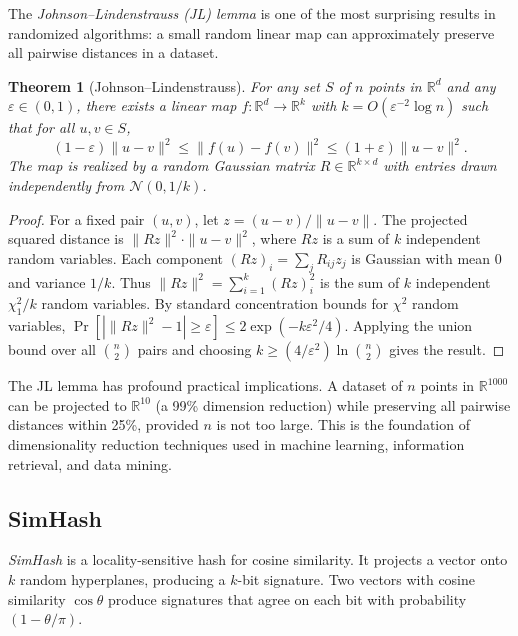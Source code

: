 \documentclass[twoside,12pt]{book}
\theoremstyle{plain}
\newtheorem{theorem}{Theorem}[chapter]
\theoremstyle{definition}
\theoremstyle{remark}
\begin{document}
The \emph{Johnson--Lindenstrauss (JL) lemma} is one of the most surprising results in randomized algorithms: a small random linear map can approximately preserve all pairwise distances in a dataset.

\begin{theorem}[Johnson--Lindenstrauss]\label{thm:jl}
For any set $S$ of $n$ points in $\mathbb{R}^d$ and any $\varepsilon \in (0,1)$, there exists a linear map $f : \mathbb{R}^d \to \mathbb{R}^k$ with $k = O(\varepsilon^{-2} \log n)$ such that for all $u, v \in S$,
\[
(1 - \varepsilon) \|u - v\|^2 \leq \|f(u) - f(v)\|^2 \leq (1 + \varepsilon) \|u - v\|^2.
\]
The map is realized by a random Gaussian matrix $R \in \mathbb{R}^{k \times d}$ with entries drawn independently from $\mathcal{N}(0, 1/k)$.
\end{theorem}

\begin{proof}
For a fixed pair $(u,v)$, let $z = (u - v)/\|u - v\|$. The projected squared distance is $\|Rz\|^2 \cdot \|u-v\|^2$, where $Rz$ is a sum of $k$ independent random variables. Each component $(Rz)_i = \sum_j R_{ij} z_j$ is Gaussian with mean 0 and variance $1/k$. Thus $\|Rz\|^2 = \sum_{i=1}^k (Rz)_i^2$ is the sum of $k$ independent $\chi^2_1 / k$ random variables. By standard concentration bounds for $\chi^2$ random variables, $\Pr[|\|Rz\|^2 - 1| \geq \varepsilon] \leq 2 \exp(-k \varepsilon^2 / 4)$. Applying the union bound over all $\binom{n}{2}$ pairs and choosing $k \geq (4/\varepsilon^2) \ln \binom{n}{2}$ gives the result.
\end{proof}

The JL lemma has profound practical implications. A dataset of $n$ points in $\mathbb{R}^{1000}$ can be projected to $\mathbb{R}^{10}$ (a 99\% dimension reduction) while preserving all pairwise distances within 25\%, provided $n$ is not too large. This is the foundation of dimensionality reduction techniques used in machine learning, information retrieval, and data mining.

\subsection{SimHash}

\emph{SimHash} is a locality-sensitive hash for cosine similarity. It projects a vector onto $k$ random hyperplanes, producing a $k$-bit signature. Two vectors with cosine similarity $\cos \theta$ produce signatures that agree on each bit with probability $(1 - \theta/\pi)$.
\end{document}
